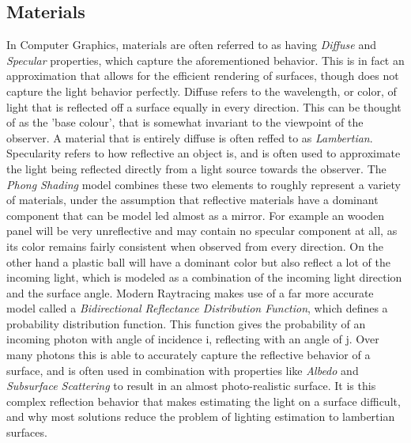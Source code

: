 \documentclass[ %
                    author={Gavin Parker},
                supervisor={Dr. Neill Campbell},
                    degree={MEng},
                     title={Deep Siamese Networks for Illumination Estimation from Stereo Images},
                  subtitle={},
                      type={Research},
                      year={2018} ]{dissertation}
\begin{document}
\subsection{Materials}
In Computer Graphics, materials are often referred to as having \textit{Diffuse} and \textit{Specular} properties, which capture the aforementioned behavior. This is in fact an approximation that allows for the efficient rendering of surfaces, though does not capture the light behavior perfectly. Diffuse refers to the wavelength, or color, of light that is reflected off a surface equally in every direction. This can be thought of as the 'base colour', that is somewhat invariant to the viewpoint of the observer. A material that is entirely diffuse is often reffed to as \textit{Lambertian}. Specularity refers to how reflective an object is, and is often used to approximate the light being reflected directly from a light source towards the observer. The \textit{Phong Shading} model combines these two elements to roughly represent a variety of materials, under the assumption that reflective materials have a dominant component that can be model led almost as a mirror. For example an wooden panel will be very unreflective and may contain no specular component at all, as its color remains fairly consistent when observed from every direction. On the other hand a plastic ball will have a dominant color but also reflect a lot of the incoming light, which is modeled as a combination of the incoming light direction and the surface angle. Modern Raytracing makes use of a far more accurate model called a \textit{Bidirectional Reflectance Distribution Function}, which defines a probability distribution function. This function gives the probability of an incoming photon with angle of incidence i, reflecting with an angle of j. Over many photons this is able to accurately capture the reflective behavior of a surface, and is often used in combination with properties like \textit{Albedo} and \textit{Subsurface Scattering} to result in an almost photo-realistic surface. It is this complex reflection behavior that makes estimating the light on a surface difficult, and why most solutions reduce the problem of lighting estimation to lambertian surfaces.
\end{document}
